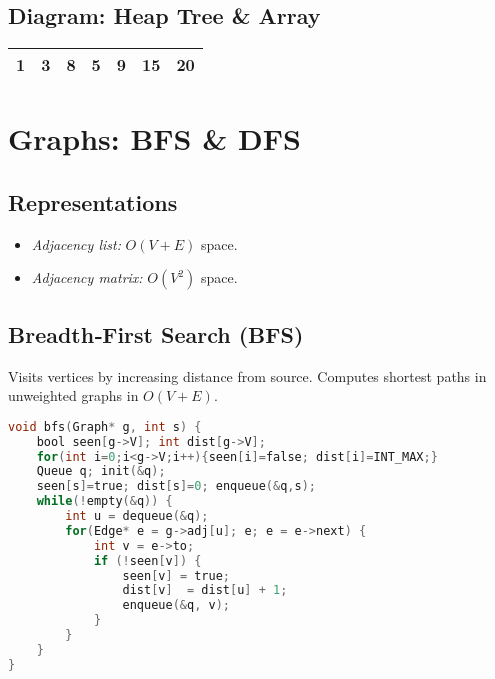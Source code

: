 \documentclass[12pt]{article}
\begin{document}
\subsection*{Diagram: Heap Tree \& Array}
\begin{center}
\qquad
\begin{tabular}{|c|c|c|c|c|c|c|}
\hline
1 & 3 & 8 & 5 & 9 & 15 & 20\\\hline
\end{tabular}
\end{center}

\newpage
\section{Graphs: BFS \& DFS}
\subsection*{Representations}
\begin{itemize}
  \item \emph{Adjacency list:} \(O(V+E)\) space.
  \item \emph{Adjacency matrix:} \(O(V^2)\) space.
\end{itemize}

\subsection*{Breadth‑First Search (BFS)}
Visits vertices by increasing distance from source.  Computes shortest paths in unweighted graphs in \(O(V+E)\).
\begin{lstlisting}[language=C]
void bfs(Graph* g, int s) {
    bool seen[g->V]; int dist[g->V];
    for(int i=0;i<g->V;i++){seen[i]=false; dist[i]=INT_MAX;}
    Queue q; init(&q);
    seen[s]=true; dist[s]=0; enqueue(&q,s);
    while(!empty(&q)) {
        int u = dequeue(&q);
        for(Edge* e = g->adj[u]; e; e = e->next) {
            int v = e->to;
            if (!seen[v]) {
                seen[v] = true;
                dist[v]  = dist[u] + 1;
                enqueue(&q, v);
            }
        }
    }
}
\end{lstlisting}
\end{document}
